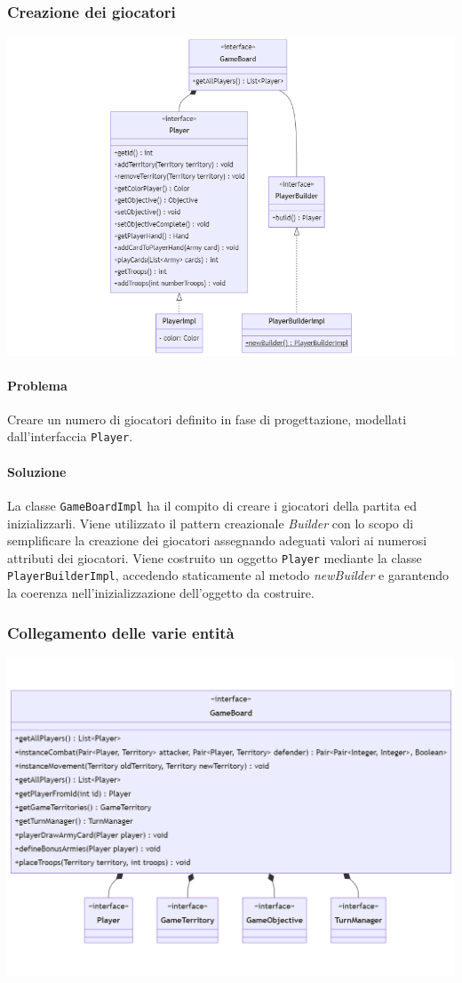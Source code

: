 \documentclass[a4paper,12pt]{report}
\begin{document}
\subsubsection{Creazione dei giocatori}
%
\includegraphics[width=\textwidth]{img/Player.png}
%
\paragraph{Problema} Creare un numero di giocatori definito in fase di progettazione, modellati dall'interfaccia \texttt{Player}.
%
\paragraph{Soluzione} La classe \texttt{GameBoardImpl} ha il compito di creare i giocatori della partita ed inizializzarli. Viene utilizzato il pattern creazionale \textit{Builder} con lo scopo di semplificare la creazione dei giocatori assegnando adeguati valori ai numerosi attributi dei giocatori. Viene costruito un oggetto \texttt{Player} mediante la classe \texttt{PlayerBuilderImpl}, accedendo staticamente al metodo \textit{newBuilder} e garantendo la coerenza nell'inizializzazione dell'oggetto da costruire.
%
\subsubsection{Collegamento delle varie entit\`a}
%
\includegraphics[width=\textwidth]{img/Board.png}
%
\end{document}
